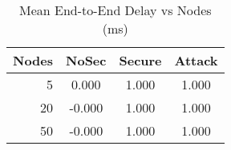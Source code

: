 \begin{table}[h]
\centering
\caption{Mean End-to-End Delay vs Nodes (ms)}
\label{tab:delay}
\begin{tabular}{rccc}
\toprule
Nodes & NoSec & Secure & Attack \\ \midrule
5 & 0.000 & 1.000 & 1.000 \\
20 & -0.000 & 1.000 & 1.000 \\
50 & -0.000 & 1.000 & 1.000 \\
\bottomrule
\end{tabular}
\end{table}